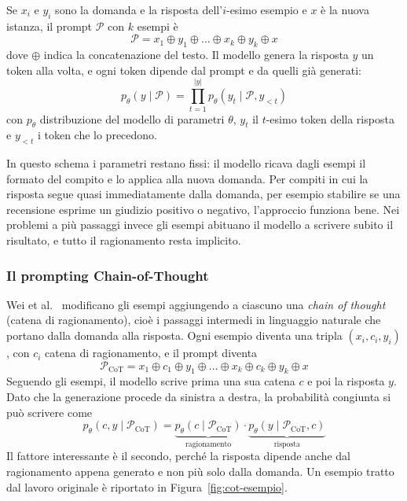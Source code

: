 Se $x_i$ e $y_i$ sono la domanda e la risposta dell'$i$-esimo esempio e $x$ è la nuova istanza, il prompt $\mathcal{P}$ con $k$ esempi è
\[
\mathcal{P} = x_1 \oplus y_1 \oplus \dots \oplus x_k \oplus y_k \oplus x
\]
dove $\oplus$ indica la concatenazione del testo. Il modello genera la risposta $y$ un token alla volta, e ogni token dipende dal prompt e da quelli già generati:
\[
p_\theta(y \mid \mathcal{P}) = \prod_{t=1}^{|y|} p_\theta(y_t \mid \mathcal{P}, y_{<t})
\]
con $p_\theta$ distribuzione del modello di parametri $\theta$, $y_t$ il $t$-esimo token della risposta e $y_{<t}$ i token che lo precedono.

In questo schema i parametri restano fissi: il modello ricava dagli esempi il formato del compito e lo applica alla nuova domanda. Per compiti in cui la risposta segue quasi immediatamente dalla domanda, per esempio stabilire se una recensione esprime un giudizio positivo o negativo, l'approccio funziona bene. Nei problemi a più passaggi invece gli esempi abituano il modello a scrivere subito il risultato, e tutto il ragionamento resta implicito.

\subsubsection{Il prompting Chain-of-Thought}

Wei et al.\ \cite{wei2022cot} modificano gli esempi aggiungendo a ciascuno una \emph{chain of thought} (catena di ragionamento), cioè i passaggi intermedi in linguaggio naturale che portano dalla domanda alla risposta. Ogni esempio diventa una tripla $(x_i, c_i, y_i)$, con $c_i$ catena di ragionamento, e il prompt diventa
\[
\mathcal{P}_{\text{CoT}} = x_1 \oplus c_1 \oplus y_1 \oplus \dots \oplus x_k \oplus c_k \oplus y_k \oplus x
\]
Seguendo gli esempi, il modello scrive prima una sua catena $c$ e poi la risposta $y$. Dato che la generazione procede da sinistra a destra, la probabilità congiunta si può scrivere come
\[
p_\theta(c, y \mid \mathcal{P}_{\text{CoT}}) =
\underbrace{p_\theta(c \mid \mathcal{P}_{\text{CoT}})}_{\text{ragionamento}}
\cdot
\underbrace{p_\theta(y \mid \mathcal{P}_{\text{CoT}}, c)}_{\text{risposta}}
\]
Il fattore interessante è il secondo, perché la risposta dipende anche dal ragionamento appena generato e non più solo dalla domanda. Un esempio tratto dal lavoro originale è riportato in Figura~\ref{fig:cot-esempio}.

